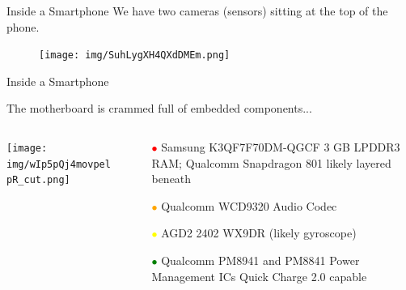 \documentclass[aspectratio=169]{beamer}
\begin{document}
	\begin{frame}{Inside a Smartphone}
		We have two cameras (sensors) sitting at the top of the phone.
		\begin{figure}[b]		
		\centering
		\texttt{[image: img/SuhLygXH4QXdDMEm.png]}
		\end{figure}
	\end{frame}



	\begin{frame}{Inside a Smartphone}
		\begin{flushleft}The motherboard is crammed full of embedded components...\end{flushleft}
		\begin{columns}
		\begin{column}{0.55\textwidth}	
		\centering
		\texttt{[image: img/wIp5pQj4movpelpR\_cut.png]}	
		\end{column}
		\begin{column}{0.45\textwidth}
		\centering		
		\begin{footnotesize}
		\begin{itemize}
		\setlength\itemsep{1em}
		\item[\textcolor{red}{$\bullet$}] Samsung K3QF7F70DM-QGCF 3 GB LPDDR3 RAM; Qualcomm Snapdragon 801 likely layered beneath
		\item[\textcolor{orange}{$\bullet$}] Qualcomm WCD9320 Audio Codec
		\item[\textcolor{yellow}{$\bullet$}] AGD2 2402 WX9DR (likely gyroscope)
		\item[\textcolor{green}{$\bullet$}] Qualcomm PM8941 and PM8841 Power Management ICs Quick Charge 2.0 capable
		\end{itemize}
		\end{footnotesize}
		\end{column}
		\end{columns}
	\end{frame}  
\end{document}
